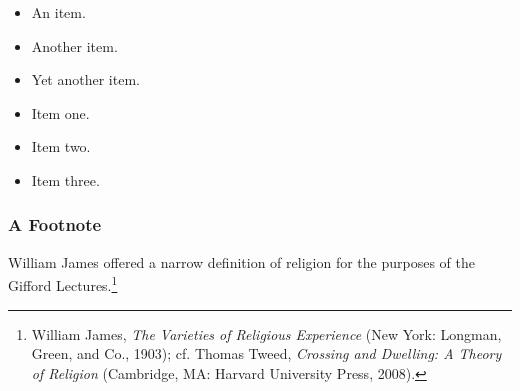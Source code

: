 \begin{itemize}
\item
  An item.
\item
  Another item.
\item
  Yet another item.
\item
  Item one.
\item
  Item two.
\item
  Item three.
\end{itemize}
\subsubsection{A Footnote}

William James offered a narrow definition of religion for the purposes
of the Gifford Lectures.\footnote{William James, \emph{The Varieties of
  Religious Experience} (New York: Longman, Green, and Co., 1903); cf.
  Thomas Tweed, \emph{Crossing and Dwelling: A Theory of Religion}
  (Cambridge, MA: Harvard University Press, 2008).}

